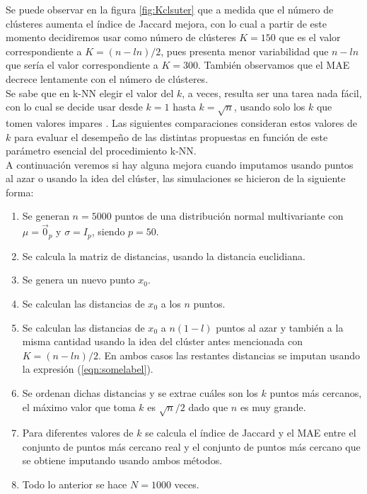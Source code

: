 \documentclass[12pt]{report} %
\theoremstyle{definition}
\begin{document}
Se puede observar en la figura \ref{fig:Kclsuter} que a medida que el número de clústeres aumenta el índice de Jaccard mejora, con lo cual a partir de este momento decidiremos usar como número de clústeres $K=150$ que es el valor correspondiente a $K = (n-ln)/2$, pues presenta menor variabilidad que $n-ln$ que sería el valor correspondiente a $K=300$. También observamos que el MAE decrece lentamente con el número de clústeres.\\

Se sabe que en k-NN elegir el valor del $k$, a veces, resulta ser una tarea nada fácil, con lo cual se decide usar desde $k=1$ hasta $k=\sqrt{n}$, usando solo los $k$ que tomen valores impares \cite{sqrtn}. Las siguientes comparaciones consideran estos valores de $k$ para evaluar el desempeño de las distintas propuestas en función de este parámetro esencial del procedimiento k-NN.\\ 

\noindent A continuación veremos si hay alguna mejora cuando imputamos usando puntos al azar o usando la idea del clúster, las simulaciones se hicieron de la siguiente forma:
\begin{enumerate}
	\item Se generan $n=5000$ puntos de una distribución normal multivariante con $\mu = \vec{0}_p$ y $\sigma = I_p$, siendo $p=50$.
	\item Se calcula la matriz de distancias, usando la distancia euclidiana.
	\item Se genera un nuevo punto $x_0$.
	\item Se calculan las distancias de $x_0$ a los $n$ puntos. 
	\item Se calculan las distancias de $x_0$ a $n(1-l)$ puntos al azar y también a la misma cantidad usando la idea del clúster antes mencionada con $K = (n-ln)/2$. En ambos casos las restantes distancias se imputan usando la expresión (\ref{eqn:somelabel}).
	\item Se ordenan dichas distancias y se extrae cuáles son los $k$ puntos más cercanos, el máximo valor que toma $k$ es $\sqrt{n}/2$ dado que $n$ es muy grande.
	\item Para diferentes valores de $k$ se calcula el índice de Jaccard y el MAE entre el conjunto de puntos más cercano real y el conjunto de puntos más cercano que se obtiene imputando usando ambos métodos.
	\item Todo lo anterior se hace $N=1000$ veces.
\end{enumerate}
\end{document}
